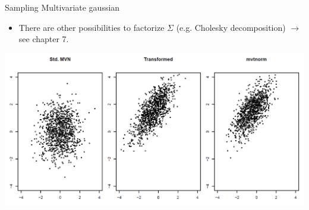 \begin{vbframe}{Sampling Multivariate gaussian}
\begin{itemize}
\lz

\item There are other possibilities to factorize $\Sigma$ (e.g. Cholesky decomposition) $\to$ see chapter 7.
\end{itemize}
\framebreak

\lz 

\begin{center}
\includegraphics[width =1\textwidth]{figure_man/multigaussian.png}
\end{center}


\end{vbframe}


